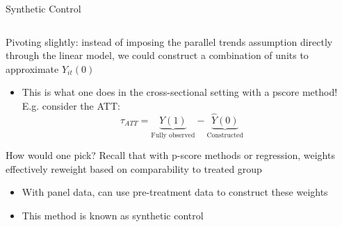 \documentclass[notes,11pt, aspectratio=169]{beamer}
\newenvironment{wideitemize}{\itemize\addtolength{\itemsep}{10pt}}{\enditemize}
\begin{document}
\begin{frame}{Synthetic Control}
  \begin{columns}[T] %
    \begin{column}{0.9\textwidth}
      \begin{wideitemize}
      \item Pivoting slightly: instead of imposing the parallel trends
        assumption directly through the linear model, we could
        construct a combination of units to approximate $Y_{it}(0)$
        \begin{itemize}
        \item This is what one does in the cross-sectional setting with a
          pscore method! E.g. consider the ATT:
          \begin{equation*}
            \tau_{ATT} = \underbrace{Y(1)}_{\text{Fully observed}} - \underbrace{\hat{Y}(0)}_{\text{Constructed}}
          \end{equation*}
        \end{itemize}
      \item How would one pick? Recall that with p-score methods or
        regression, weights effectively reweight based on
        comparability to treated group
        \begin{itemize}
        \item With panel data, can use pre-treatment data to construct
          these weights
        \item This method is known as synthetic control
        \end{itemize}
      \end{wideitemize}
    \end{column}%
    \hfill%
    \begin{column}{.5\textwidth}
    \end{column}%
  \end{columns}
\end{frame}
\end{document}
